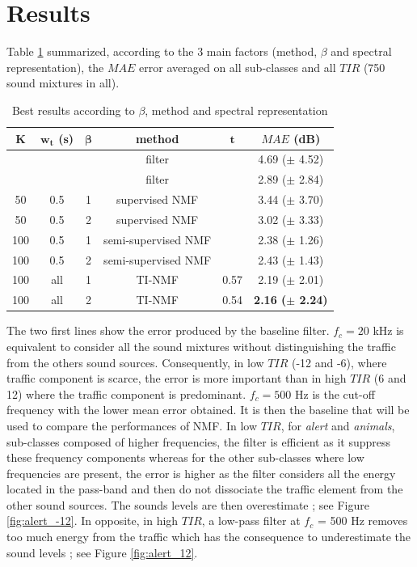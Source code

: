 \documentclass[twocolumn,a4paper,10pt]{article}
\begin{document}
\section{Results}\label{part:results}

Table \ref{tab:results} summarized, according to the 3 main factors (method, $\beta$ and spectral representation), the $MAE$ error averaged on all sub-classes and all $TIR$ (750 sound mixtures in all).\\

\begin{table}[]
\centering
\begin{tabular}{@{}cccccc@{}}
\toprule
$\mathbf{K}$ & $\mathbf{w_t}$ (s) &  $\mathbf{\beta}$ & \textbf{method} & $\mathbf{t}$ & \textbf{$MAE$ (dB)} \\ \midrule
 &  &  & filter &  & 4.69 ($\pm$ 4.52) \\
 &  &  & filter &  & 2.89 ($\pm$ 2.84) \\ \hline \hline
50 & 0.5  & 1 & supervised NMF &  & 3.44 ($\pm$ 3.70) \\
50 & 0.5  & 2 & supervised NMF &  & 3.02 ($\pm$ 3.33) \\ \hline \hline
100 & 0.5 & 1 & semi-supervised NMF &  & 2.38 ($\pm$ 1.26) \\
100 & 0.5 & 2 & semi-supervised NMF &  & 2.43 ($\pm$ 1.43) \\ \hline \hline
100 & all & 1 & TI-NMF & 0.57 & 2.19 ($\pm$ 2.01) \\
100 & all & 2 & TI-NMF & 0.54 & \textbf{2.16 ($\pm$ 2.24)}\\ \bottomrule
\end{tabular}
\caption{Best results according to $\beta$, method and  spectral representation}
\label{tab:results}
\end{table}


The two first lines show the error produced by the baseline filter. $f_c = 20 $ kHz is equivalent to consider all the sound mixtures without distinguishing the traffic from the others sound sources. Consequently, in low $TIR$ (-12 and -6), where traffic component is scarce, the error is more important than in high $TIR$ (6 and 12) where the traffic component is predominant. $f_c = 500$ Hz is the cut-off frequency with the lower mean error obtained. It is then the baseline that will be used to compare the performances of NMF. In low $TIR$, for \textit{alert} and \textit{animals}, sub-classes composed of higher frequencies, the filter is efficient as it suppress these frequency components whereas for the other sub-classes where low frequencies are present, the error is higher as the filter considers all the energy located in the pass-band and then do not dissociate the traffic element from the other sound sources. The sounds levels are then overestimate ; see Figure \ref{fig:alert_-12}. In opposite, in high $TIR$, a low-pass filter at $f_c$ = 500 Hz removes too much energy from the traffic which has the consequence to underestimate the sound levels ; see Figure \ref{fig:alert_12}.\\
\end{document}
